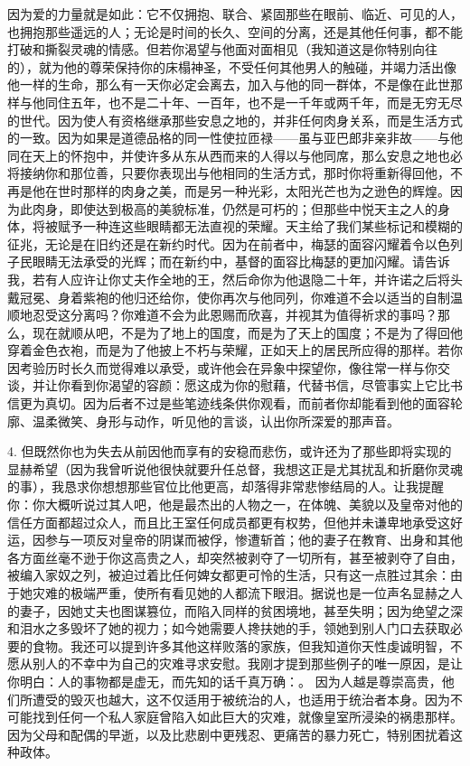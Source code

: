 因为爱的力量就是如此：它不仅拥抱、联合、紧固那些在眼前、临近、可见的人，也拥抱那些遥远的人；无论是时间的长久、空间的分离，还是其他任何事，都不能打破和撕裂灵魂的情感。但若你渴望与他面对面相见（我知道这是你特别向往的），就为他的尊荣保持你的床榻神圣，不受任何其他男人的触碰，并竭力活出像他一样的生命，那么有一天你必定会离去，加入与他的同一群体，不是像在此世那样与他同住五年，也不是二十年、一百年，也不是一千年或两千年，而是无穷无尽的世代。因为使人有资格继承那些安息之地的，并非任何肉身关系，而是生活方式的一致。因为如果是道德品格的同一性使拉匝禄——虽与亚巴郎非亲非故——与他同在天上的怀抱中，并使许多从东从西而来的人得以与他同席，那么安息之地也必将接纳你和那位善，只要你表现出与他相同的生活方式，那时你将重新得回他，不再是他在世时那样的肉身之美，而是另一种光彩，太阳光芒也为之逊色的辉煌。因为此肉身，即使达到极高的美貌标准，仍然是可朽的；但那些中悦天主之人的身体，将被赋予一种连这些眼睛都无法直视的荣耀。天主给了我们某些标记和模糊的征兆，无论是在旧约还是在新约时代。因为在前者中，梅瑟的面容闪耀着令以色列子民眼睛无法承受的光辉；而在新约中，基督的面容比梅瑟的更加闪耀。请告诉我，若有人应许让你丈夫作全地的王，然后命你为他退隐二十年，并许诺之后将头戴冠冕、身着紫袍的他归还给你，使你再次与他同列，你难道不会以适当的自制温顺地忍受这分离吗？你难道不会为此恩赐而欣喜，并视其为值得祈求的事吗？那么，现在就顺从吧，不是为了地上的国度，而是为了天上的国度；不是为了得回他穿着金色衣袍，而是为了他披上不朽与荣耀，正如天上的居民所应得的那样。若你因考验历时长久而觉得难以承受，或许他会在异象中探望你，像往常一样与你交谈，并让你看到你渴望的容颜：愿这成为你的慰藉，代替书信，尽管事实上它比书信更为真切。因为后者不过是些笔迹线条供你观看，而前者你却能看到他的面容轮廓、温柔微笑、身形与动作，听见他的言谈，认出你所深爱的那声音。\par

4. 但既然你也为失去从前因他而享有的安稳而悲伤，或许还为了那些即将实现的显赫希望（因为我曾听说他很快就要升任总督，我想这正是尤其扰乱和折磨你灵魂的事），我恳求你想想那些官位比他更高，却落得非常悲惨结局的人。让我提醒你：你大概听说过其人吧，他是最杰出的人物之一，在体魄、美貌以及皇帝对他的信任方面都超过众人，而且比王室任何成员都更有权势，但他并未谦卑地承受这好运，因参与一项反对皇帝的阴谋而被俘，惨遭斩首；他的妻子在教育、出身和其他各方面丝毫不逊于你这高贵之人，却突然被剥夺了一切所有，甚至被剥夺了自由，被编入家奴之列，被迫过着比任何婢女都更可怜的生活，只有这一点胜过其余：由于她灾难的极端严重，使所有看见她的人都流下眼泪。据说也是一位声名显赫之人的妻子，因她丈夫也图谋篡位，而陷入同样的贫困境地，甚至失明；因为绝望之深和泪水之多毁坏了她的视力；如今她需要人搀扶她的手，领她到别人门口去获取必要的食物。我还可以提到许多其他这样败落的家族，但我知道你天性虔诚明智，不愿从别人的不幸中为自己的灾难寻求安慰。我刚才提到那些例子的唯一原因，是让你明白：人的事物都是虚无，而先知的话千真万确：。 因为人越是尊崇高贵，他们所遭受的毁灭也越大，这不仅适用于被统治的人，也适用于统治者本身。因为不可能找到任何一个私人家庭曾陷入如此巨大的灾难，就像皇室所浸染的祸患那样。因为父母和配偶的早逝，以及比悲剧中更残忍、更痛苦的暴力死亡，特别困扰着这种政体。\par

